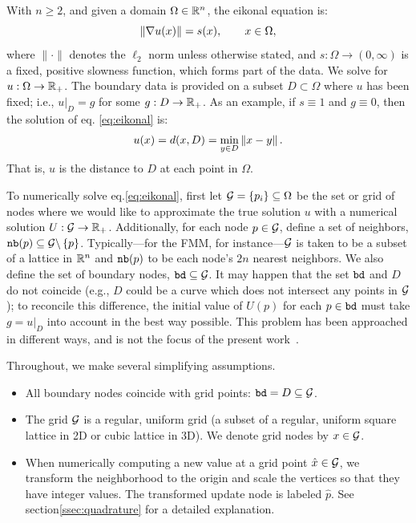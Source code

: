 \documentclass[smallcondensed]{svjour3}
\begin{document}
With $n \geq 2$, and given a domain $\Omega \in \mathbb{R}^n$, the eikonal
equation is:
\begin{equation}\label{eq:eikonal}
  \left\|\nabla u(x)\right\| = s(x), \qquad x \in \Omega,
\end{equation}
where $\|\cdot\|$ denotes the $\ell_2$ norm unless otherwise stated,
and $s : \Omega \to (0, \infty)$ is a fixed, positive slowness
function, which forms part of the data. We solve for
$u : \Omega \to \mathbb{R}_+$. The boundary data is provided on a subset
$D \subset \Omega$ where $u$ has been fixed; i.e.,
$\left. u \right|_D = g$ for some $g : D \to \mathbb{R}_+$. As an example, if
$s \equiv 1$ and $g \equiv 0$, then the solution of eq.\@
\ref{eq:eikonal} is:
\begin{equation}
  \label{eq:distance-to-Omega}
  u(x) = d(x, D) = \min_{y \in D} \left\|x - y\right\|.
\end{equation}
That is, $u$ is the distance to $D$ at each point in
$\Omega$.

To numerically solve eq.\@ \ref{eq:eikonal}, first let
$\mathcal{G} = \{p_i\} \subseteq \Omega$ be the set or grid of nodes where
we would like to approximate the true solution $u$ with a numerical
solution $U : \mathcal{G} \to \mathbb{R}_+$. Additionally, for each node
$p \in \mathcal{G}$, define a set of neighbors,
$\texttt{nb}(p) \subseteq \mathcal{G} \backslash \left\{p\right\}$. Typically---for the
FMM, for instance---$\mathcal{G}$ is taken to be a subset of a lattice in
$\mathbb{R}^n$ and $\texttt{nb}(p)$ to be each node's $2n$ nearest neighbors. We
also define the set of boundary nodes, $\texttt{bd} \subseteq \mathcal{G}$. It
may happen that the set $\texttt{bd}$ and $D$ do not coincide (e.g., $D$
could be a curve which does not intersect any points in $\mathcal{G}$); to
reconcile this difference, the initial value of $U(p)$ for each
$p \in \texttt{bd}$ must take $g = \left. u \right|_D$ into account in
the best way possible. This problem has been approached in different
ways, and is not the focus of the present work~\cite{chopp2001some}.

Throughout, we make several simplifying assumptions.
\begin{itemize}
\item All boundary nodes coincide with grid points:
  $\texttt{bd} = D \subseteq \mathcal{G}$.
\item The grid $\mathcal{G}$ is a regular, uniform grid (a subset of a
  regular, uniform square lattice in 2D or cubic lattice in 3D). We
  denote grid nodes by $x \in \mathcal{G}$.
\item When numerically computing a new value at a grid point
  $\hat{x} \in \mathcal{G}$, we transform the neighborhood to the origin and
  scale the vertices so that they have integer values. The transformed
  update node is labeled $\hat{p}$. See section\@ \ref{ssec:quadrature}
  for a detailed explanation.
\end{itemize}
\end{document}
